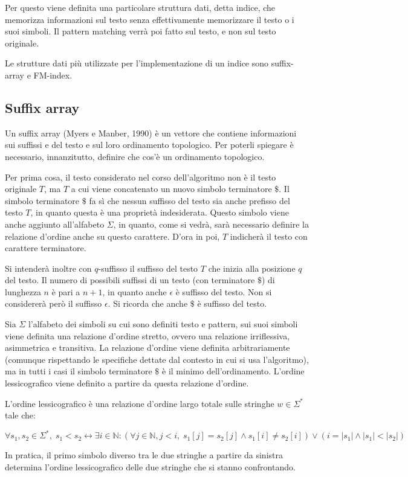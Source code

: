 Per questo viene definita una particolare struttura dati, detta indice, che memorizza informazioni sul testo senza effettivamente memorizzare il testo o i suoi simboli.
Il pattern matching verrà poi fatto sul testo, e non sul testo originale.

Le strutture dati più utilizzate per l'implementazione di un indice sono suffix-array e FM-index.

\subsection*{Suffix array}
Un suffix array (Myers e Manber, 1990) è un vettore che contiene informazioni sui suffissi e del testo e sul loro ordinamento topologico.
Per poterli spiegare è necessario, innanzitutto, definire che cos'è un ordinamento topologico.

Per prima cosa, il testo considerato nel corso dell'algoritmo non è il testo originale $T$, ma $T$ a cui viene concatenato un nuovo simbolo terminatore $\$$.
Il simbolo terminatore $\$$ fa sì che nessun suffisso del testo sia anche prefisso del testo $T$, in quanto questa è una proprietà indesiderata.
Questo simbolo viene anche aggiunto all'alfabeto $\Sigma$, in quanto, come si vedrà, sarà necessario definire la relazione d'ordine anche su questo carattere.
D'ora in poi, $T$ indicherà il testo con carattere terminatore.

Si intenderà inoltre con $q$-suffisso il suffisso del testo $T$ che inizia alla posizione $q$ del testo.
Il numero di possibili suffissi di un testo (con terminatore $\$$) di lunghezza $n$ è pari a $n+1$, in quanto anche $\epsilon$ è suffisso del testo.
Non si considererà però il suffisso $\epsilon$.
Si ricorda che anche $\$$ è suffisso del testo.

Sia $\Sigma$ l'alfabeto dei simboli su cui sono definiti testo e pattern, sui suoi simboli viene definita una relazione d'ordine stretto, ovvero una relazione irriflessiva, asimmetrica e transitiva.
La relazione d'ordine viene definita arbitrariamente (comunque rispettando le specifiche dettate dal contesto in cui si usa l'algoritmo), ma in tutti i casi il simbolo terminatore $\$$ è il minimo dell'ordinamento.
L'ordine lessicografico viene definito a partire da questa relazione d'ordine.

L'ordine lessicografico è una relazione d'ordine largo totale sulle stringhe $w \in \Sigma^*$ tale che:
\begin{center}
    $\forall s_1, s_2 \in \Sigma^*, \; s_1 < s_2 \longleftrightarrow \exists i \in \mathbb{N} : \left( \forall j \in \mathbb{N}, j < i, \; s_1[j] = s_2[j] \land s_1[i] \neq s_2[i] \right) \lor \left( i = |s_1| \land |s_1| < |s_2| \right)$
\end{center}
In pratica, il primo simbolo diverso tra le due stringhe a partire da sinistra determina l'ordine lessicografico delle due stringhe che si stanno confrontando.


